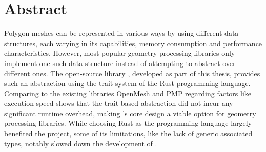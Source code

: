 \chapter*{\hfill Abstract}


Polygon meshes can be represented in various ways by using different data structures, each varying in its capabilities, memory consumption and performance characteristics.
However, most popular geometry processing libraries only implement one such data structure instead of attempting to abstract over different ones.
The open-source library , developed as part of this thesis, provides such an abstraction using the trait system of the Rust programming language.
Comparing  to the existing libraries OpenMesh and PMP regarding factors like execution speed shows that the trait-based abstraction did not incur any significant runtime overhead, making 's core design a viable option for geometry processing libraries.
While choosing Rust as the programming language largely benefited the project, some of its limitations, like the lack of generic associated types, notably slowed down the development of .




%





















